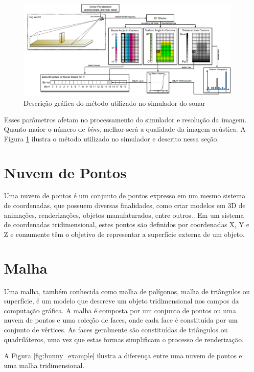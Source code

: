 \begin{figure}[H]
    \centering
    \caption{Descrição gráfica do método utilizado no simulador do sonar}
    \label{fig:gpu_sonar_sim}
    \includegraphics[scale=0.35]{dados/figuras/gpu_sonar.png}
\end{figure}

Esses parâmetros afetam no processamento do simulador e resolução da imagem. Quanto maior o número de \textit{bins}, melhor será a qualidade da imagem acústica. A Figura \ref{fig:gpu_sonar_sim} ilustra o método utilizado no simulador e descrito nessa seção.

\section{Nuvem de Pontos}
\label{sec:point_cloud}
Uma nuvem de pontos é um conjunto de pontos expresso em um mesmo sistema de coordenadas, que possuem diversas finalidades, como criar modelos em 3D de animações, renderizações, objetos manufaturados, entre outros.. 
Em um sistema de coordenadas tridimensional, estes pontos são definidos por coordenadas X, Y e Z e comumente têm o objetivo de representar a superfície externa de um objeto.

\section{Malha}
\label{sec:mesh}
Uma malha, também conhecida como malha de polígonos, malha de triângulos ou superfície, é um modelo que descreve um objeto tridimensional nos campos da computação gráfica. 
A malha é composta por um conjunto de pontos ou uma nuvem de pontos e uma coleção de faces, onde cada face é constituída por um conjunto de vértices. 
As faces geralmente são constituídas de triângulos ou quadriláteros, uma vez que estas formas simplificam o processo de renderização.

A Figura \ref{fig:bunny_example} ilustra a diferença entre uma nuvem de pontos e uma malha tridimensional.

